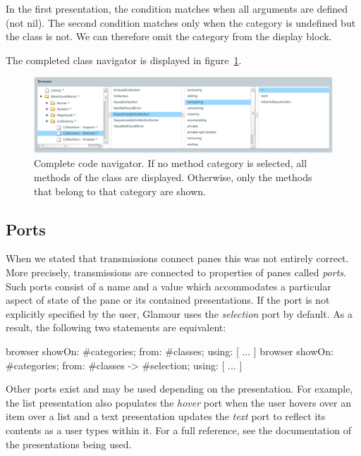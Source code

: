\documentclass[a4paper,10pt,twoside]{book}
\begin{document}
In the first presentation, the condition matches when all arguments
are defined (not nil). The second condition matches only when the
category is undefined but the class is not. We can therefore omit the
category from the display block.

The completed class navigator is displayed in
figure~\ref{fig:codenavigator}.

\begin{figure}[htbp]
\centerline{\includegraphics[width=\linewidth]{codenavigator.pdf}}
\caption{Complete code navigator. If no method category is selected, all methods of the class
are displayed. Otherwise, only the methods that belong to that category are shown.}
\label{fig:codenavigator}
\end{figure}


\subsection{Ports}

When we stated that transmissions connect panes this was not entirely
correct. More precisely, transmissions are connected to properties of
panes called \emph{ports}. Such ports consist of a name and a value
which accommodates a particular aspect of state of the pane or its
contained presentations. If the port is not explicitly specified by
the user, Glamour uses the \emph{selection} port by default. As a
result, the following two statements are equivalent:

\begin{code}{}
browser showOn: #categories; from: #classes; using: [ ... ]
browser showOn: #categories; from: #classes -> #selection; using: [ ... ]
\end{code}

Other ports exist and may be used depending on the presentation. For
example, the list presentation also populates the \emph{hover} port
when the user hovers over an item over a list and a text presentation
updates the \emph{text} port to reflect its contents as a user types
within it. For a full reference, see the documentation of the
presentations being used.
\end{document}
